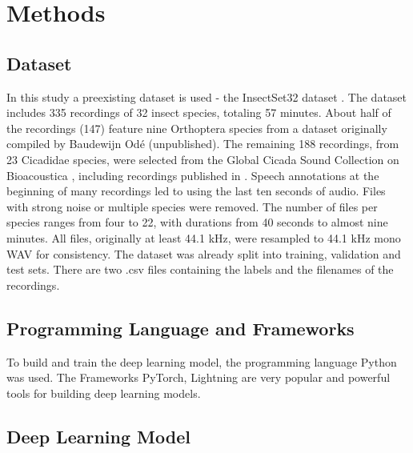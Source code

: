 

\section{Methods}
\label{methods}

\subsection{Dataset}%

In this study a preexisting dataset is used - the InsectSet32 dataset \autocite{faissInsectSet32DatasetAutomatic2022}. 
The dataset includes 335 recordings of 32 insect species, totaling 57 minutes.
About half of the recordings (147) feature nine Orthoptera species from a dataset originally compiled by Baudewijn Odé (unpublished). 
The remaining 188 recordings, from 23 Cicadidae species, were selected from the Global Cicada Sound 
Collection on Bioacoustica \autocite{bakerBioAcousticaFreeOpen2015}, including recordings 
published in \autocites{bakerGlobalCicadaSound2015}{poppleRevisionMyopsaltaCrucifera2017}. 
Speech annotations at the beginning of many recordings led to using the last ten seconds of audio. 
Files with strong noise or multiple species were removed. The number of files per species ranges from four to 22, 
with durations from 40 seconds to almost nine minutes. All files, originally at least 44.1 kHz, 
were resampled to 44.1 kHz mono WAV for consistency.
The dataset was already split into training, validation and test sets. There are two .csv files containing
the labels and the filenames of the recordings.

\subsection{Programming Language and Frameworks}%
To build and train the deep learning model, the programming language Python was used.
The Frameworks PyTorch, Lightning are very popular and powerful tools for building deep learning models.

\subsection{Deep Learning Model}%

